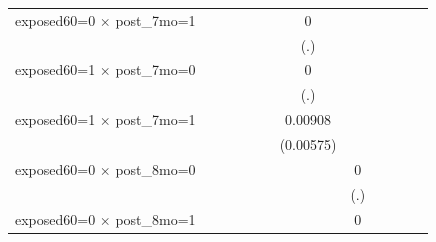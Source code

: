 \begin{table}[htbp]
\begin{tabular}{l*{11}{c}}
\addlinespace
exposed60=0 $\times$ post\_7mo=1&                     &                     &                     &                     &                     &           0         &                     &                     &                     &                     &                     \\
                    &                     &                     &                     &                     &                     &         (.)         &                     &                     &                     &                     &                     \\
\addlinespace
exposed60=1 $\times$ post\_7mo=0&                     &                     &                     &                     &                     &           0         &                     &                     &                     &                     &                     \\
                    &                     &                     &                     &                     &                     &         (.)         &                     &                     &                     &                     &                     \\
\addlinespace
exposed60=1 $\times$ post\_7mo=1&                     &                     &                     &                     &                     &     0.00908         &                     &                     &                     &                     &                     \\
                    &                     &                     &                     &                     &                     &   (0.00575)         &                     &                     &                     &                     &                     \\
\addlinespace
exposed60=0 $\times$ post\_8mo=0&                     &                     &                     &                     &                     &                     &           0         &                     &                     &                     &                     \\
                    &                     &                     &                     &                     &                     &                     &         (.)         &                     &                     &                     &                     \\
\addlinespace
exposed60=0 $\times$ post\_8mo=1&                     &                     &                     &                     &                     &                     &           0         &                     &                     &                     &                     \\

\end{tabular}
\end{table}
